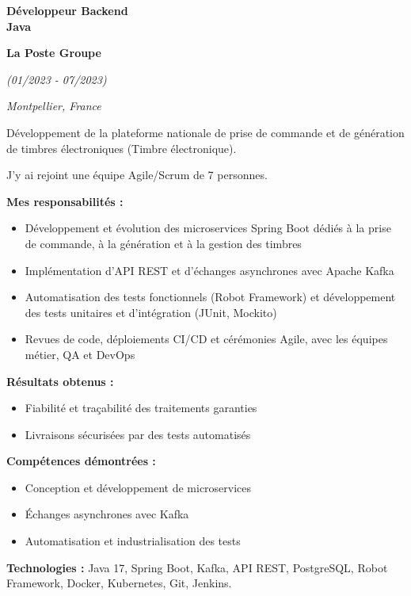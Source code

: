 \documentclass[a4paper,10pt]{article}
\newcommand{\dcsub}[1]{%
  \par\vspace{2.1mm}%
  \noindent\textbf{#1}\par
  \vspace{0.4mm}%
}
\newcommand{\dctech}[1]{%
  \par\vspace{2.0mm}%
  \noindent\textbf{Technologies :} #1\par
}
\newlength{\dcleftw}\setlength{\dcleftw}{51.2mm}
\newlength{\dcgap}\setlength{\dcgap}{2.8mm}
\newcommand{\dcexperience}[2]{%
  \par\noindent
  \begin{minipage}[t]{\dcleftw}
    \raggedright #1
  \end{minipage}%
  \hspace{\dcgap}%
  \begin{minipage}[t]{\dimexpr\textwidth-\dcleftw-\dcgap\relax}
    \raggedright\color{dcbody}#2
  \end{minipage}%
  \par
}
\newcommand{\dcjob}[4]{%
  {\fontsize{11.2}{13.4}\selectfont\bfseries\color{dcnavy}#1}\par
  \vspace{0.7mm}%
  {\fontsize{10}{12}\selectfont\bfseries\color{dcnavy}#2}\par
  \vspace{0.9mm}%
  {\fontsize{8.2}{10}\selectfont\itshape\color{dcmuted}(#3)}\par
  \vspace{0.35mm}%
  {\fontsize{7.8}{9.5}\selectfont\itshape\color{dcgoldsoft}#4}\par
}
\newcommand{\dcpageframe}{%
  \noindent{\color{dcgold}\hrule height 0.5pt}\par
  \vspace{4.5mm}%
}
\newcommand{\dcfooter}[1]{%
  \vfill
  \noindent{\color{dcgold}\hrule height 0.5pt}\par
  \vspace{2.2mm}%
  \noindent{\fontsize{9}{11}\selectfont\color{dcmuted}#1}%
}
\begin{document}
\dcexperience{%
  \dcjob{Développeur Backend\\Java}%
        {La Poste Groupe}%
        {01/2023 - 07/2023}%
        {Montpellier, France}
}{%
  Développement de la plateforme nationale de prise de commande et de génération de
  timbres électroniques (Timbre électronique).

  \vspace{1.2mm}
  J'y ai rejoint une équipe Agile/Scrum de 7 personnes.

  \dcsub{Mes responsabilités :}
  \begin{itemize}
    \item Développement et évolution des microservices Spring Boot dédiés à la prise de
          commande, à la génération et à la gestion des timbres
    \item Implémentation d'API REST et d'échanges asynchrones avec Apache Kafka
    \item Automatisation des tests fonctionnels (Robot Framework) et développement des
          tests unitaires et d'intégration (JUnit, Mockito)
    \item Revues de code, déploiements CI/CD et cérémonies Agile, avec les équipes métier,
          QA et DevOps
  \end{itemize}

  \dcsub{Résultats obtenus :}
  \begin{itemize}
    \item Fiabilité et traçabilité des traitements garanties
    \item Livraisons sécurisées par des tests automatisés
  \end{itemize}

  \dcsub{Compétences démontrées :}
  \begin{itemize}
    \item Conception et développement de microservices
    \item Échanges asynchrones avec Kafka
    \item Automatisation et industrialisation des tests
  \end{itemize}

  \dctech{Java 17, Spring Boot, Kafka, API REST, PostgreSQL, Robot Framework, Docker, Kubernetes, Git, Jenkins.}
}

\dcfooter{4}
\clearpage

\fontsize{9}{11.2}\selectfont
\dcpageframe
\end{document}
